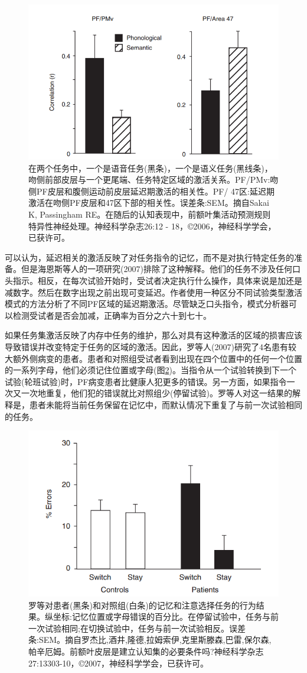\begin{figure}[!htb]
	\centering
	\includegraphics[width=0.5\linewidth]{image_pfc/Fig_9_4}
	\caption{在两个任务中，一个是语音任务(黑条)，一个是语义任务(黑线条)，吻侧前部皮层与一个更尾端、任务特定区域的激活关系。PF/PMv:吻侧PF皮层和腹侧运动前皮层延迟期激活的相关性。PF/ 47区:延迟期激活在吻侧PF皮层和47区下部的相关性。误差条:SEM。摘自Sakai K, Passingham RE。在随后的认知表现中，前额叶集活动预测规则特异性神经处理。神经科学杂志26:12 - 18，©2006，神经科学学会，已获许可。\label{fig:fig_9_4}}
\end{figure}
\par
可以认为，延迟相关的激活反映了对任务指令的记忆，而不是对执行特定任务的准备。但是海恩斯等人的一项研究(2007)排除了这种解释。他们的任务不涉及任何口头指示。相反，在每次试验开始时，受试者决定执行什么操作，具体来说是加还是减数字。然后在数字出现之前出现可变延迟。作者使用一种区分不同试验类型激活模式的方法分析了不同PF区域的延迟期激活。尽管缺乏口头指令，模式分析器可以检测受试者是否会加减，正确率为百分之六十到七十。
\par
如果任务集激活反映了内存中任务的维护，那么对具有这种激活的区域的损害应该导致错误并改变特定于任务的区域的激活。因此，罗等人(2007)研究了4名患有较大额外侧病变的患者。患者和对照组受试者看到出现在四个位置中的任何一个位置的一系列字母，他们必须记住位置或字母(图\ref{fig:fig_9_5})。当指令从一个试验转换到下一个试验(轮班试验)时，PF病变患者比健康人犯更多的错误。另一方面，如果指令一次又一次地重复，他们犯的错误就比对照组少(停留试验)。罗等人对这一结果的解释是，患者未能将当前任务保留在记忆中，而默认情况下重复了与前一次试验相同的任务。
\par
\begin{figure}[!htb]
	\centering
	\includegraphics[width=0.5\linewidth]{image_pfc/Fig_9_5}
	\caption{罗等对患者(黑条)和对照组(白条)的记忆和注意选择任务的行为结果。纵坐标:记忆位置或字母错误的百分比。在停留试验中，任务与前一次试验相同;在切换试验中，任务与前一次试验相反。误差条:SEM。摘自罗杰比,酒井,隆德,拉姆索伊,克里斯滕森,巴雷,保尔森, 帕辛厄姆。前额叶皮层是建立认知集的必要条件吗?神经科学杂志27:13303-10，©2007，神经科学学会，已获许可。\label{fig:fig_9_5}}
\end{figure}

